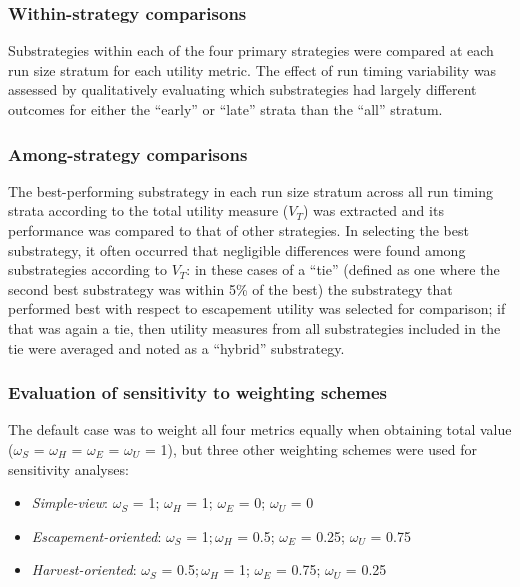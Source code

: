 \documentclass[12pt,]{book}
\theoremstyle{definition}
\theoremstyle{definition}
\theoremstyle{definition}
\theoremstyle{remark}
\begin{document}
\subsubsection{Within-strategy
comparisons}\label{within-strategy-comparisons}

\noindent
Substrategies within each of the four primary strategies were compared
at each run size stratum for each utility metric. The effect of run
timing variability was assessed by qualitatively evaluating which
substrategies had largely different outcomes for either the ``early'' or
``late'' strata than the ``all'' stratum.

\subsubsection{Among-strategy
comparisons}\label{among-strategy-comparisons}

\noindent
The best-performing substrategy in each run size stratum across all run
timing strata according to the total utility measure (\(V_T\)) was
extracted and its performance was compared to that of other strategies.
In selecting the best substrategy, it often occurred that negligible
differences were found among substrategies according to \(V_T\): in
these cases of a ``tie'' (defined as one where the second best
substrategy was within 5\% of the best) the substrategy that performed
best with respect to escapement utility was selected for comparison; if
that was again a tie, then utility measures from all substrategies
included in the tie were averaged and noted as a ``hybrid'' substrategy.

\subsubsection{Evaluation of sensitivity to weighting
schemes}\label{alt-weights}

\noindent
The default case was to weight all four metrics equally when obtaining
total value (\(\omega_S\) = \(\omega_H\) = \(\omega_E\) = \(\omega_U\) =
1), but three other weighting schemes were used for sensitivity
analyses:

\begin{itemize}
\item
  \emph{Simple-view}: \(\omega_S\) = 1; \(\omega_H\) = 1; \(\omega_E\) =
  0; \(\omega_U\) = 0
\item
  \emph{Escapement-oriented}: \(\omega_S\) = 1\(; \omega_H\) = 0.5;
  \(\omega_E\) = 0.25; \(\omega_U\) = 0.75
\item
  \emph{Harvest-oriented}: \(\omega_S\) = 0.5\(; \omega_H\) = 1;
  \(\omega_E\) = 0.75; \(\omega_U\) = 0.25
\end{itemize}
\end{document}

